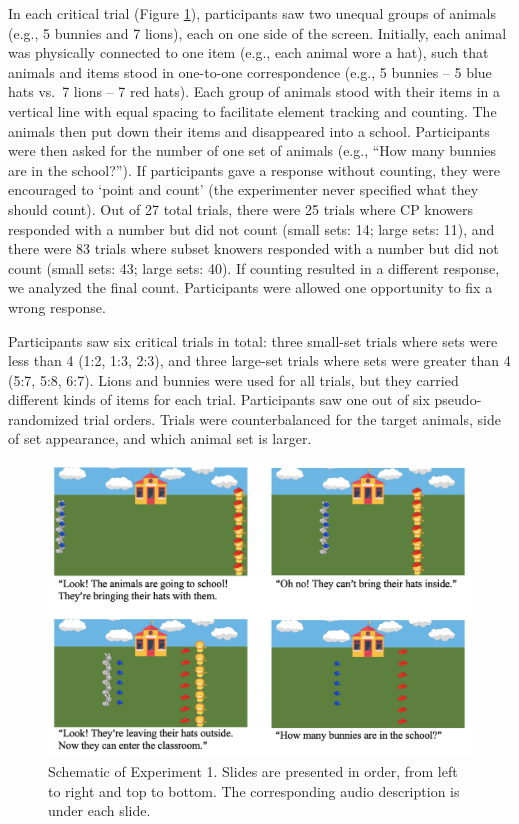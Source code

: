 \documentclass[
  man,floatsintext]{apa7}
\begin{document}
In each critical trial (Figure \ref{fig:exp1-figure}), participants saw two unequal groups of animals (e.g., 5 bunnies and 7 lions), each on one side of the screen. Initially, each animal was physically connected to one item (e.g., each animal wore a hat), such that animals and items stood in one-to-one correspondence (e.g., 5 bunnies -- 5 blue hats vs.~7 lions -- 7 red hats). Each group of animals stood with their items in a vertical line with equal spacing to facilitate element tracking and counting. The animals then put down their items and disappeared into a school. Participants were then asked for the number of one set of animals (e.g., ``How many bunnies are in the school?''). If participants gave a response without counting, they were encouraged to `point and count' (the experimenter never specified what they should count). Out of 27 total trials, there were 25 trials where CP knowers responded with a number but did not count (small sets: 14; large sets: 11), and there were 83 trials where subset knowers responded with a number but did not count (small sets: 43; large sets: 40). If counting resulted in a different response, we analyzed the final count. Participants were allowed one opportunity to fix a wrong response.

Participants saw six critical trials in total: three small-set trials where sets were less than 4 (1:2, 1:3, 2:3), and three large-set trials where sets were greater than 4 (5:7, 5:8, 6:7). Lions and bunnies were used for all trials, but they carried different kinds of items for each trial. Participants saw one out of six pseudo-randomized trial orders. Trials were counterbalanced for the target animals, side of set appearance, and which animal set is larger.

\begin{figure}[h]

{\centering \includegraphics[width=1\linewidth]{figs/exp1} 

}

\caption{Schematic of Experiment 1. Slides are presented in order, from left to right and top to bottom. The corresponding audio description is under each slide.}\label{fig:exp1-figure}
\end{figure}
\end{document}
